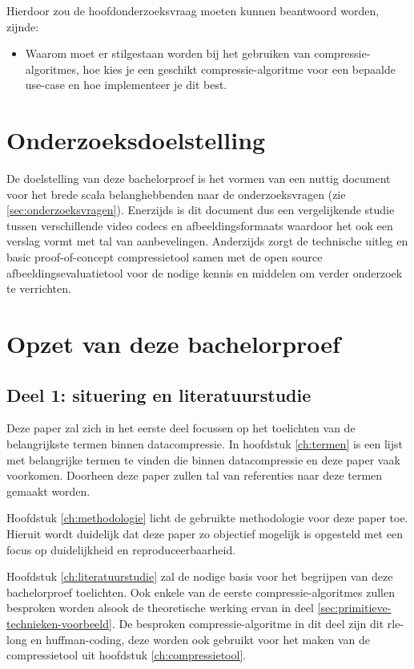 Hierdoor zou de hoofdonderzoeksvraag moeten kunnen beantwoord worden, zijnde:
\begin{itemize}
	\item Waarom moet er stilgestaan worden bij het gebruiken van \glspl{compressie-algoritme}, hoe kies je een geschikt \gls{compressie-algoritme} voor een bepaalde \gls{use-case} en hoe implementeer je dit best.
\end{itemize}

\section{Onderzoeksdoelstelling}
\label{sec:onderzoeksdoelstelling}

De doelstelling van deze bachelorproef is het vormen van een nuttig document voor het brede scala belanghebbenden naar de onderzoeksvragen (zie \ref{sec:onderzoeksvragen}). Enerzijds is dit document dus een vergelijkende studie tussen verschillende video \glspl{codec} en \glspl{afbeeldingsformaat} waardoor het ook een verslag vormt met tal van aanbevelingen. Anderzijds zorgt de technische uitleg en basic proof-of-concept \gls{compressietool} samen met de open source \gls{afbeeldingsevaluatietool} voor de nodige kennis en middelen om verder onderzoek te verrichten.

\section{Opzet van deze bachelorproef}
\label{sec:opzet-bachelorproef}
\subsection{Deel 1: situering en literatuurstudie}
\label{sec:opzet-bachelorproef-deel-1}

Deze paper zal zich in het eerste deel focussen op het toelichten van de belangrijkste termen binnen \gls{datacompressie}. In hoofdstuk \ref{ch:termen} is een lijst met belangrijke termen te vinden die binnen \gls{datacompressie} en deze paper vaak voorkomen. Doorheen deze paper zullen tal van referenties naar deze termen gemaakt worden. 

Hoofdstuk \ref{ch:methodologie} licht de gebruikte methodologie voor deze paper toe. Hieruit wordt duidelijk dat deze paper zo objectief mogelijk is opgesteld met een focus op duidelijkheid en reproduceerbaarheid.

Hoofdstuk \ref{ch:literatuurstudie} zal de nodige basis voor het begrijpen van deze bachelorproef toelichten. Ook enkele van de eerste \glspl{compressie-algoritme} zullen besproken worden alsook de theoretische werking ervan in deel \ref{sec:primitieve-technieken-voorbeeld}. De besproken \gls{compressie-algoritme} in dit deel zijn dit \gls{rle-long} en \gls{huffman-coding}, deze worden ook gebruikt voor het maken van de \gls{compressietool} uit hoofdstuk \ref{ch:compressietool}.

